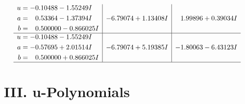 \documentclass[1p]{elsarticle_modified}
\theoremstyle{definition}
\begin{document}
$$\begin{array}{c|c|c}
\begin{aligned}
u &= -0.10488 - 1.55249 I \\
a &= \phantom{-}0.53364 - 1.37394 I \\
b &= \phantom{-}0.500000 - 0.866025 I\end{aligned}
 & -6.79074 + 1.13408 I & \phantom{-}1.99896 + 0.39034 I \\ \hline\begin{aligned}
u &= -0.10488 - 1.55249 I \\
a &= -0.57695 + 2.01514 I \\
b &= \phantom{-}0.500000 + 0.866025 I\end{aligned}
 & -6.79074 + 5.19385 I & -1.80063 - 6.43123 I\\
 \hline 
 \end{array}$$\newpage
\newpage\renewcommand{\arraystretch}{1}
\centering \section*{ III. u-Polynomials}
\end{document}
